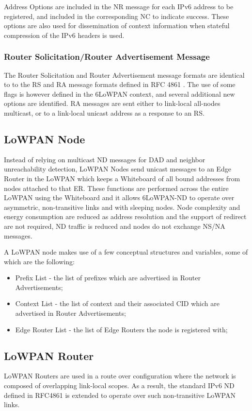 \documentclass[a4paper,11pt,oneside]{article}
\begin{document}
Address Options are included in the NR message for each IPv6 address to be registered, and included in the corresponding NC to indicate success. These options are also used for dissemination of context information when stateful compression of the IPv6 headers is used.

\subsubsection{Router Solicitation/Router Advertisement Message}
The Router Solicitation and Router Advertisement message formats are identical to to the RS and RA
message formats defined in RFC 4861 \cite{rfc4861}. The use of some flags is however defined in the 6LoWPAN context, and several additional new options are identified. RA messages are sent either to link-local all-nodes multicast, or to a link-local unicast address as a response to an RS.

\subsection{LoWPAN Node}
Instead of relying on multicast ND messages for DAD and neighbor unreachability detection, LoWPAN Nodes send unicast messages to an Edge Router in the LoWPAN which keeps a Whiteboard of all bound addresses from nodes attached to that ER. These functions are performed across the entire LoWPAN using the Whiteboard and it allows 6LoWPAN-ND to operate over asymmetric, non-transitive links and with sleeping nodes. Node complexity and energy
consumption are reduced as address resolution and the support of redirect are not required, ND traffic is reduced and nodes do not exchange NS/NA messages.  

A LoWPAN node makes use of a few conceptual structures and variables, some of which are the following: 
\begin{itemize}
\item Prefix List  - the list of prefixes which are advertised in Router Advertisements;
\item Context List  - the list of context and their associated CID which are advertised in Router Advertisements;
\item Edge Router List  - the list of Edge Routers the node is registered with;
\end{itemize}

\subsection{LoWPAN Router}
LoWPAN Routers are used in a route over configuration where the network is composed of overlapping link-local scopes. As a result, the standard IPv6 ND defined in RFC4861 \cite{rfc4861} is extended to operate over such non-transitive LoWPAN links. 
\end{document}
